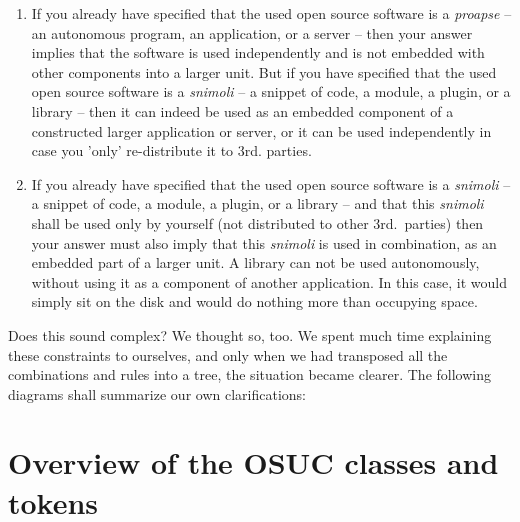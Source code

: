\begin{enumerate}
  \label{InvalidFinderTokenCombinations}
  \item If you already have specified that the used open source software is a
  \emph{proapse} -- an autonomous program, an application, or a server -- then
  your answer implies that the software is used independently and is not
  embedded with other components into a larger unit. But if you have specified
  that the used open source software is a \emph{snimoli} -- a snippet of
  code, a module, a plugin, or a library -- then it can indeed be used as an
  embedded component of a constructed larger application or server, or it can be
  used independently in case you 'only' re-distribute it to 3rd. parties.
  
  \item If you already have specified that the used open source software is a
  \emph{snimoli} -- a snippet of code, a module, a plugin, or a library -- and
  that this \emph{snimoli} shall be used only by yourself (not distributed to
  other 3rd.\ parties) then your answer must also imply that this \emph{snimoli}
  is used in combination, as an embedded part of a larger unit. A library can
  not be used autonomously, without using it as a component of another
  application. In this case, it would simply sit on the disk and would do
  nothing more than occupying space.

\end{enumerate}

Does this sound complex? We thought so, too. We spent much time explaining these
constraints to ourselves, and only when we had transposed all the combinations
and rules into a tree, the situation became clearer. The following diagrams
shall summarize our own clarifications:

\section{Overview of the OSUC classes and tokens}



